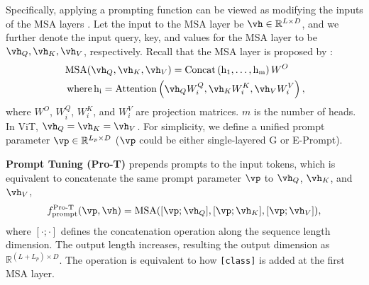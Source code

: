 \documentclass[runningheads]{llncs}
\newcommand{\sayna}[1]{\textcolor{blue}{Sayna: #1}}
\def\pfunc{{f_{\text{prompt}}}}
\begin{document}

Specifically, applying a prompting function can be viewed as modifying the inputs of the MSA layers \cite{vaswani2017attention}. Let the input to the MSA layer be $\vh \in \mathbb{R}^{L \times D}$, and we further denote the input query, key, and values for the MSA layer to be $\vh_Q,  \vh_K, \vh_V$, respectively. Recall that the MSA layer is proposed by \cite{vaswani2017attention}:
\begin{equation*}
\begin{aligned}
&\operatorname{ MSA }(\vh_Q, \vh_K, \vh_V) =\operatorname { Concat }\left(\operatorname { h }_{1}, \ldots, \operatorname { h }_{\mathrm{m}}\right) W^{O} \\
&\text { where} \operatorname{h}_{\mathrm{i}} =\operatorname{Attention}\left(\vh_Q W_{i}^{Q}, \vh_K W_{i}^{K}, \vh_V W_{i}^{V}\right),
\end{aligned}
\end{equation*}
where $W^{O}$, $W_{i}^{Q}$, $W_{i}^{K}$, and $W_{i}^{V}$ are projection matrices. $m$ is the number of heads. In ViT, $\vh_Q = \vh_K = \vh_V$.
For simplicity, we define a unified prompt parameter $\vp \in \mathbb{R}^{L_{p} \times D}$ ($\vp$ could be either single-layered G or E-Prompt).

\textbf{Prompt Tuning (Pro-T)} 
prepends prompts to the input tokens, which is equivalent to concatenate the same prompt parameter $\vp$ to $\vh_Q$, $\vh_K$, and $\vh_V$, 
\begin{equation}
f_{\operatorname{prompt}}^{\operatorname{{Pro-T}}}(\vp, \vh) = \operatorname{ MSA }([\vp;\vh_Q], [\vp;\vh_K], [\vp;\vh_V]),  
\end{equation}
where $[\cdot;\cdot]$ defines the concatenation operation along the sequence length dimension. The output length increases, resulting the output dimension as $\mathbb{R}^{(L+L_p) \times D}$. The operation is equivalent to how \verb|[class]| is added \cite{dosovitskiy2020image} at the first MSA layer. 
\end{document}
